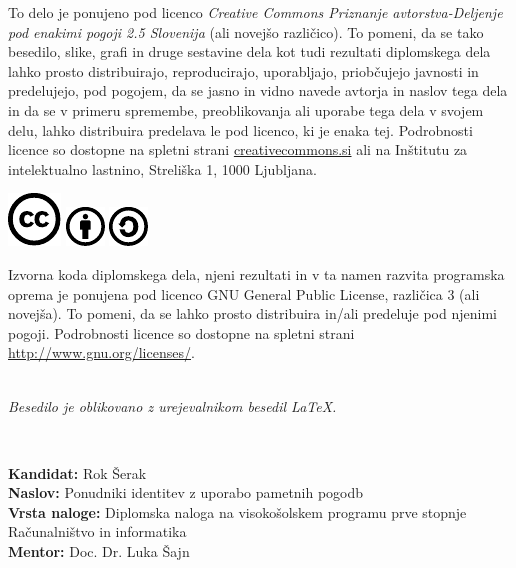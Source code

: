 \documentclass[a4paper,12pt,openright]{book}
\newcommand{\clearemptydoublepage}{\newpage{\pagestyle{empty}\cleardoublepage}}
\newcommand{\CcImageCc}[1]{%
	\includegraphics[scale=#1]{cc_cc_30.pdf}%
}
\newcommand{\CcImageBy}[1]{%
	\includegraphics[scale=#1]{cc_by_30.pdf}%
}
\newcommand{\CcImageSa}[1]{%
	\includegraphics[scale=#1]{cc_sa_30.pdf}%
}
\begin{document}
\newpage
\thispagestyle{empty}

\vspace*{5cm}
{\small \noindent
To delo je ponujeno pod licenco \textit{Creative Commons Priznanje avtorstva-Deljenje pod enakimi pogoji 2.5 Slovenija} (ali novej\v so razli\v cico).
To pomeni, da se tako besedilo, slike, grafi in druge sestavine dela kot tudi rezultati diplomskega dela lahko prosto distribuirajo,
reproducirajo, uporabljajo, priobčujejo javnosti in predelujejo, pod pogojem, da se jasno in vidno navede avtorja in naslov tega
dela in da se v primeru spremembe, preoblikovanja ali uporabe tega dela v svojem delu, lahko distribuira predelava le pod
licenco, ki je enaka tej.
Podrobnosti licence so dostopne na spletni strani \href{http://creativecommons.si}{creativecommons.si} ali na Inštitutu za
intelektualno lastnino, Streliška 1, 1000 Ljubljana.

\vspace*{1cm}
\begin{center}%
\CcImageCc{0.741573033707865}\hspace*{1ex}\CcImageBy{1}\hspace*{1ex}\CcImageSa{1}%
\end{center}
}

\vspace*{1cm}
{\small \noindent
Izvorna koda diplomskega dela, njeni rezultati in v ta namen razvita programska oprema je ponujena pod licenco GNU General Public License,
različica 3 (ali novejša). To pomeni, da se lahko prosto distribuira in/ali predeluje pod njenimi pogoji.
Podrobnosti licence so dostopne na spletni strani \url{http://www.gnu.org/licenses/}.
}

\vfill
\begin{center} 
\ \\ \vfill
{\em
Besedilo je oblikovano z urejevalnikom besedil \LaTeX.}
\end{center}

\clearemptydoublepage

\thispagestyle{empty}
\
\vfill

\bigskip
\noindent\textbf{Kandidat:} Rok Šerak \\
\noindent\textbf{Naslov:} Ponudniki identitev z uporabo pametnih pogodb \\
\noindent\textbf{Vrsta naloge:} Diplomska naloga na visokošolskem programu prve stopnje Računalništvo in informatika \\
\noindent\textbf{Mentor:} Doc. Dr. Luka Šajn \\
\end{document}
